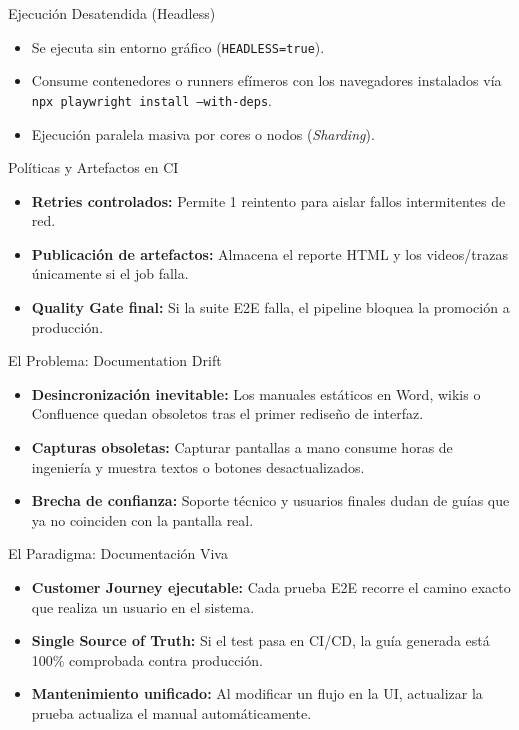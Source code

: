 \documentclass[aspectratio=169]{beamer}
\begin{document}
  {Ejecución Desatendida (Headless)}
  {
    {\footnotesize
    \begin{itemize}
      \item Se ejecuta sin entorno gráfico (\texttt{HEADLESS=true}).
      \item Consume contenedores o runners efímeros con los navegadores instalados vía \texttt{npx playwright install --with-deps}.
      \item Ejecución paralela masiva por cores o nodos (\textit{Sharding}).
    \end{itemize}
    }
  }
  {Políticas y Artefactos en CI}
  {
    {\footnotesize
    \begin{itemize}
      \item \textbf{Retries controlados:} Permite 1 reintento para aislar fallos intermitentes de red.
      \item \textbf{Publicación de artefactos:} Almacena el reporte HTML y los videos/trazas únicamente si el job falla.
      \item \textbf{Quality Gate final:} Si la suite E2E falla, el pipeline bloquea la promoción a producción.
    \end{itemize}
    }
  }

  {El Problema: Documentation Drift}
  {
    {\footnotesize
    \begin{itemize}
      \item \textbf{Desincronización inevitable:} Los manuales estáticos en Word, wikis o Confluence quedan obsoletos tras el primer rediseño de interfaz.
      \item \textbf{Capturas obsoletas:} Capturar pantallas a mano consume horas de ingeniería y muestra textos o botones desactualizados.
      \item \textbf{Brecha de confianza:} Soporte técnico y usuarios finales dudan de guías que ya no coinciden con la pantalla real.
    \end{itemize}
    }
  }
  {El Paradigma: Documentación Viva}
  {
    {\footnotesize
    \begin{itemize}
      \item \textbf{Customer Journey ejecutable:} Cada prueba E2E recorre el camino exacto que realiza un usuario en el sistema.
      \item \textbf{Single Source of Truth:} Si el test pasa en CI/CD, la guía generada está 100\% comprobada contra producción.
      \item \textbf{Mantenimiento unificado:} Al modificar un flujo en la UI, actualizar la prueba actualiza el manual automáticamente.
    \end{itemize}
    }
  }
\end{document}
